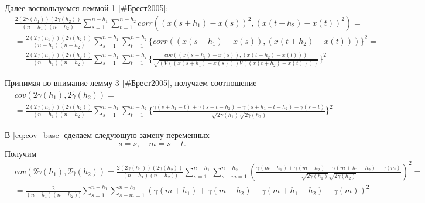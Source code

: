 \documentclass[a4paper]{article}
\begin{document}
Далее воспользуемся леммой 1 [\#Брест2005]:
\begin{eqnarray*}
	& \frac{2 (2\gamma(h_1))(2\gamma(h_2))}{(n-h_1)(n-h_2)}\sum_{s=1}^{n-h_1}\sum_{t=1}^{n-h_2} corr((x(s+h_1) - x(s))^2, (x(t+h_2) - x(t))^2) = \\
	& = \frac{2 (2\gamma(h_1))(2\gamma(h_2))}{(n-h_1)(n-h_2)}\sum_{s=1}^{n-h_1}\sum_{t=1}^{n-h_2} \{corr((x(s+h_1) - x(s)), (x(t+h_2) - x(t))) \}^2 = \\
	& = \frac{2 (2\gamma(h_1))(2\gamma(h_2))}{(n-h_1)(n-h_2)}\sum_{s=1}^{n-h_1}\sum_{t=1}^{n-h_2} \{\frac{cov((x(s+h_1) - x(s)), (x(t+h_2) - x(t)))}{\sqrt{(V((x(s+h_1) - x(s))) V((x(t+h_2) - x(t))))}} \}^2
\end{eqnarray*}

Принимая во внимание лемму 3 [\#Брест2005], получаем соотношение
\begin{eqnarray}
\nonumber
\label{eq:cov_base}
	& cov(2 \tilde{\gamma}(h_1), 2 \tilde{\gamma}(h_2)) = \\
	& = \frac{2 (2\gamma(h_1))(2\gamma(h_2))}{(n-h_1)(n-h_2)}\sum_{s=1}^{n-h_1}\sum_{t=1}^{n-h_2} \{\frac{\gamma(s+h_1-t) + \gamma(s-t-h_2) - \gamma(s+h_1-t-h_2) - \gamma(s-t)}{\sqrt{2 \gamma(h_1)} \sqrt{2 \gamma(h_2)}} \}^2
\end{eqnarray}

В \eqref{eq:cov_base} сделаем следующую замену переменных
\begin{equation*}
	s = s, \quad m = s - t.
\end{equation*}
Получим
\begin{eqnarray}
\nonumber
	& cov(2 \tilde{\gamma}(h_1), 2 \tilde{\gamma}(h_2)) = \frac{2(2 \gamma(h_1))(2 \gamma(h_2))}{(n - h_1) (n - h_2))} \sum_{s = 1}^{n - h_1}\sum_{s - m = 1}^{n - h_2} (\frac{\gamma(m + h_1) + \gamma(m - h_2) - \gamma(m + h_1 - h_2) - \gamma(m)}{\sqrt{2 \gamma(h_1)} \sqrt{2 \gamma(h_2)}})^2 = \\
	& = \frac{2}{(n - h_1) (n - h_2))} \sum_{s = 1}^{n - h_1}\sum_{s - m = 1}^{n - h_2} (\gamma(m + h_1) + \gamma(m - h_2) - \gamma(m + h_1 - h_2) - \gamma(m))^2
\end{eqnarray}


\end{document}
